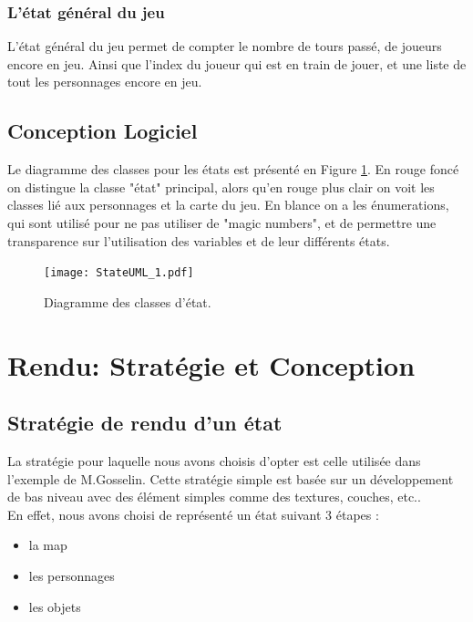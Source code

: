 \documentclass[a4paper,12pt]{article}
\begin{document}
\subsubsection{L'état général du jeu}

L'état général du jeu permet de compter le nombre de tours passé, de joueurs encore en jeu.
Ainsi que l'index du joueur qui est en train de jouer, et une liste de tout les personnages encore en jeu.

\subsection{Conception Logiciel}

Le diagramme des classes pour les états est présenté en Figure \ref{uml:state}. En rouge foncé
on distingue la classe "état" principal, alors qu'en rouge plus clair on voit les classes lié aux personnages 
et la carte du jeu. En blance on a les énumerations, qui sont utilisé pour ne pas utiliser de "magic numbers", 
et de permettre une transparence sur l'utilisation des variables et de leur différents états.

\begin{landscape}
\begin{figure}[p]
\texttt{[image: StateUML\_1.pdf]}
\caption{\label{uml:state}Diagramme des classes d'état.} 
\end{figure}
\end{landscape}

\clearpage
\section{Rendu: Stratégie et Conception}

\subsection{Stratégie de rendu d'un état}
La stratégie pour laquelle nous avons choisis d'opter est celle utilisée dans l'exemple de M.Gosselin. Cette stratégie simple est basée sur un développement de bas niveau avec des élément simples comme des textures, couches, etc..\\
En effet, nous avons choisi de représenté un état suivant 3 étapes :\\
\begin{itemize}
\item la map 
\item les personnages
\item les objets\\
\end{itemize}
\par 
\end{document}
